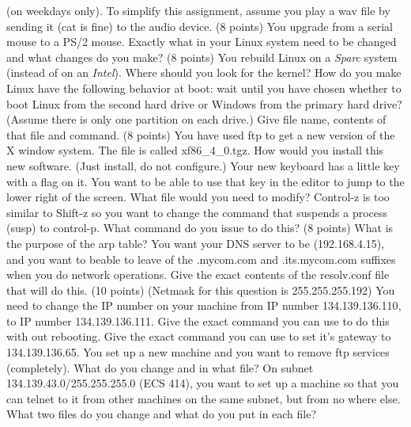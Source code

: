 (on weekdays only).
To simplify this assignment, assume you play a wav file by
sending it ({\ltt{}cat} is fine) to the {\ltt{}audio} device.
\vskip 2.5in
\ques
(8 points)
You upgrade from a serial mouse to a PS/2 mouse.
Exactly what in your Linux system need to be changed 
and what changes do you make?
\vskip 1.0in
\ques
(8 points)
You rebuild Linux on a {\it Sparc} system (instead of on an {\it Intel}).
Where should you look for the kernel?
\vskip 0.4in
How do you make Linux have the following behavior at boot:
wait until you have chosen whether to boot Linux from the second
hard drive or Windows from the primary hard drive?
(Assume there is only one partition on each drive.)
Give file name, contents of that file and command.
\vfill\eject
\ques
(8 points)
You have used ftp to get a new version of the X window system.
The file is called {\ltt{}xf86_4_0.tgz}.
How would you install this new software. (Just install, do not configure.)
\vskip 0.8in
Your new keyboard has a little key with a flag on it. You want to be
able to use that key in the editor to jump to the lower right of the
screen. What file would you need to modify?
\vskip 0.4in
Control-z is too similar to Shift-z so you want to change the command
that suspends a process ({\ltt{}susp}) to control-p.
What command do you issue to do this?
\vskip 0.4in
\ques
(8 points)
What is the purpose of the arp table?
\vskip 0.5in
You want your DNS server to be ({\ltt{}192.168.4.15}), and you want to
beable to leave of the {\ltt{}.mycom.com} and {\ltt{}.its.mycom.com}
suffixes when you do network operations.
Give the exact contents of the {\ltt{}resolv.conf} file that will do this.
\vskip 1.2in
\ques
(10 points)
(Netmask for this question is {\ltt{}255.255.255.192}) 
\hfill
\break
You need to change the IP number on your machine from
IP number {\ltt{}134.139.136.110},
to IP number {\ltt{}134.139.136.111}.
Give the exact command you can use to do this with out rebooting.
\vskip 0.5in
Give the exact command you can use to set it's gateway to  
{\ltt{}134.139.136.65}.
\vskip 0.5in
You set up a new machine and you want to
remove ftp services (completely).
What do you change and in what file?
\vskip 0.5in
On subnet {\ltt{}134.139.43.0/255.255.255.0} (ECS 414),
you want to set up a machine so that you can telnet
to it from other machines on the same subnet,
but from no where else.
What two files do you change and what do you put in each file?
\bye

